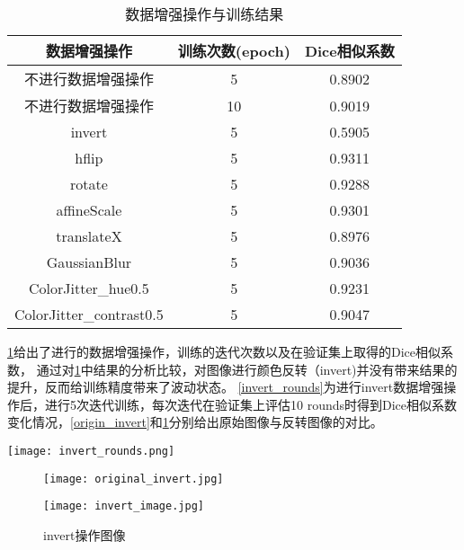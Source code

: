 \documentclass[AutoFakeBold]{LZUThesis}
\begin{document}
\begin{table}[htbp] %
    \setlength{\abovecaptionskip}{0cm}
    \setlength{\belowcaptionskip}{0.2cm}
    \centering
    \caption{数据增强操作与训练结果}
    \label{aug_result}
    \begin{tabular}{|c|c|c|}
        \hline
        数据增强操作             & 训练次数(epoch) & Dice相似系数 \\
        \hline
        不进行数据增强操作       & 5               & 0.8902       \\
        \hline
        不进行数据增强操作       & 10              & 0.9019       \\
        \hline
        invert                   & 5               & 0.5905       \\
        \hline
        hflip                    & 5               & 0.9311       \\
        \hline
        rotate                   & 5               & 0.9288       \\
        \hline
        affineScale              & 5               & 0.9301       \\
        \hline
        translateX               & 5               & 0.8976       \\
        \hline
        GaussianBlur             & 5               & 0.9036       \\
        \hline
        ColorJitter\_hue0.5      & 5               & 0.9231       \\
        \hline
        ColorJitter\_contrast0.5 & 5               & 0.9047       \\
        \hline
    \end{tabular}
\end{table}

\cref{aug_result}给出了进行的数据增强操作，训练的迭代次数以及在验证集上取得的Dice相似系数，
通过对\cref{aug_result}中结果的分析比较，对图像进行颜色反转（invert)并没有带来结果的提升，反而给训练精度带来了波动状态。
\cref{invert_rounds}为进行invert数据增强操作后，进行5次迭代训练，每次迭代在验证集上评估10 rounds时得到Dice相似系数变化情况，\cref{origin_invert}和\cref{invert_image}分别给出原始图像与反转图像的对比。
\begin{figure*}
    \centering
    \texttt{[image: invert\_rounds.png]}
    \caption{进行invert数据增强在验证集上的Dice相似系数}
    \label{invert_rounds}
\end{figure*}

\begin{figure}[htbp]
    \begin{minipage}[t]{0.5\linewidth}  %
        \centering
        \texttt{[image: original\_invert.jpg]}
        \caption{原始图像}
        \label{origin_invert}
    \end{minipage}
    \hfill%
    \begin{minipage}[t]{0.5\linewidth}
        \centering
        \texttt{[image: invert\_image.jpg]}
        \caption{invert操作图像}
        \label{invert_image}
    \end{minipage}
\end{figure}
\end{document}
